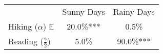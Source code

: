 \documentclass{standalone}
\begin{document}
\begin{tabular}{lcc}
\toprule 
\midrule 
 & Sunny Days & Rainy Days \\[3pt]
 \cmidrule(lr){2-3} 
Hiking ($\alpha$) $\mathbb{E}$ & 20.0\%*** & 0.5\% \\
{\color{green} Reading} ($\frac{\gamma}{2}$) & 5.0\% & 90.0\%*** \\
\midrule 
\bottomrule 
\end{tabular}
\end{document}
